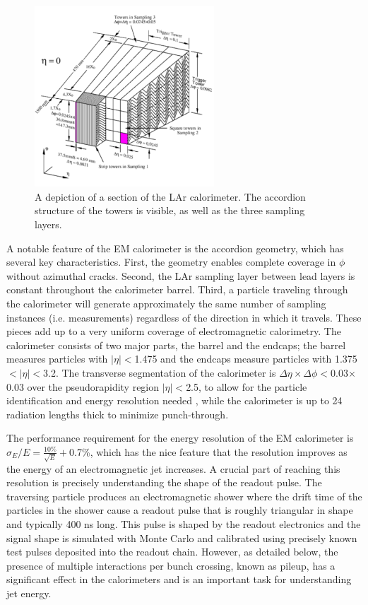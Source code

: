 \begin{figure}
\begin{center}
	\includegraphics[width=0.6\textwidth]{ATLASDetector/images/LArg_accordion.pdf}	
	\caption{A depiction of a section of the LAr calorimeter.  The accordion structure of the towers is visible, as well as the three sampling layers. 	\label{fig:lar}}
\end{center}
\end{figure}


A notable feature of the EM calorimeter is the accordion geometry, which has several key characteristics.  First, 
the geometry enables complete coverage in $\phi$ without azimuthal cracks.  Second, the LAr sampling layer between 
lead layers is constant throughout the calorimeter barrel.  Third, a particle traveling through the calorimeter will generate approximately 
the same number of sampling instances (i.e. measurements) regardless of the direction in which it 
travels.  These pieces add up to a very uniform coverage of electromagnetic calorimetry.  The calorimeter consists of two 
major parts, the barrel and the endcaps; the barrel measures particles with $|\eta|<$1.475 
and the endcaps measure particles with 1.375$<|\eta|<$3.2.  The transverse segmentation of the calorimeter
is $\Delta\eta \times \Delta\phi<$0.03$\times$ 0.03 over the pseudorapidity region $|\eta|<$2.5,  
to allow for the particle identification and energy resolution needed \cite{cal_tdr}, while the 
calorimeter is up to 24 radiation lengths thick to minimize punch-through.

The performance requirement for the energy resolution of the EM calorimeter is 
$\sigma_E/E=\frac{10\%}{\sqrt{E}}+$0.7\%, which has the nice feature that the resolution improves
as the energy of an electromagnetic jet increases.
A crucial part of reaching this resolution is precisely understanding the shape of the readout pulse.  The traversing particle 
produces an electromagnetic shower where the drift time of the particles in the shower cause a readout pulse that is 
roughly triangular in shape and typically 400 ns long.  This pulse is shaped by the readout electronics and the 
signal shape is simulated with Monte Carlo and calibrated using precisely known test pulses deposited into the readout chain.  
However, as detailed below, the presence of multiple interactions per bunch crossing, known as pileup, has 
a significant effect in the calorimeters and is an important task for understanding jet energy.

